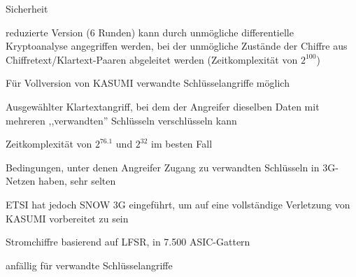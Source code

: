 \documentclass[a4paper]{article}
\begin{document}
\begin{multicols}{3}
      Sicherheit
      \begin{itemize*}
            \item reduzierte Version (6 Runden) kann durch unmögliche differentielle Kryptoanalyse angegriffen werden, bei der unmögliche Zustände der Chiffre aus Chiffretext/Klartext-Paaren abgeleitet werden (Zeitkomplexität von $2^{100}$)
            \item Für Vollversion von KASUMI verwandte Schlüsselangriffe möglich
            \begin{itemize*}
                  \item Ausgewählter Klartextangriff, bei dem der Angreifer dieselben Daten mit mehreren ,,verwandten'' Schlüsseln verschlüsseln kann
                  \item Zeitkomplexität von $2^{76.1}$ und $2^{32}$ im besten Fall
                  \item Bedingungen, unter denen Angreifer Zugang zu verwandten Schlüsseln in 3G-Netzen haben, sehr selten
            \end{itemize*}
            \item ETSI hat jedoch SNOW 3G eingeführt, um auf eine vollständige Verletzung von KASUMI vorbereitet zu sein
            \begin{itemize*}
                  \item Stromchiffre basierend auf LFSR, in 7.500 ASIC-Gattern %
                  \item anfällig für verwandte Schlüsselangriffe
            \end{itemize*}
      \end{itemize*}


\end{multicols}
\end{document}
